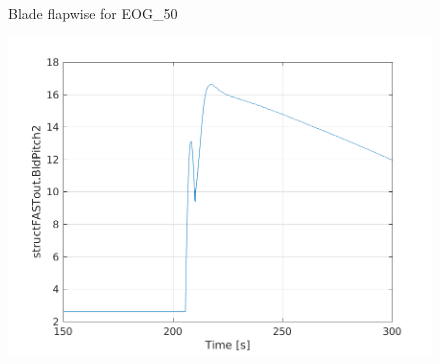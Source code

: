 \documentclass[12pt,t]{beamer}
\begin{document}
\begin{frame}
\begin{figure}[H]
\begin{minipage}{0.40\textwidth}
    \centering
      \footnotesize
   Blade flapwise for EOG\_50
\end{minipage}
\begin{minipage}{0.40\textwidth}
  \includegraphics[width=1\linewidth]{../CIP_6/FASTextreme/EOG_50/BldPitch2.png} \\
    \centering
      \footnotesize
\end{minipage}
\end{figure}
\end{frame}
\end{document}
